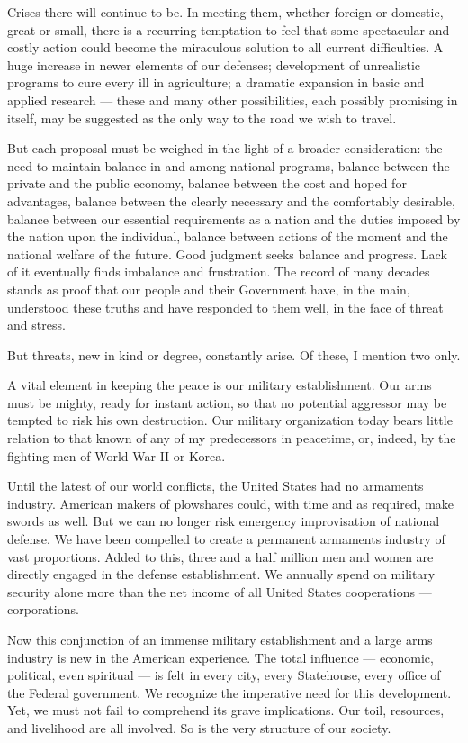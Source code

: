 \documentclass[a4paper]{amsbook}
\begin{document}
Crises there will continue to be. In meeting them, whether foreign or domestic, great or small, there is a recurring temptation to feel that some spectacular and costly action could become the miraculous solution to all current difficulties. A huge increase in newer elements of our defenses; development of unrealistic programs to cure every ill in agriculture; a dramatic expansion in basic and applied research — these and many other possibilities, each possibly promising in itself, may be suggested as the only way to the road we wish to travel.

But each proposal must be weighed in the light of a broader consideration: the need to maintain balance in and among national programs, balance between the private and the public economy, balance between the cost and hoped for advantages, balance between the clearly necessary and the comfortably desirable, balance between our essential requirements as a nation and the duties imposed by the nation upon the individual, balance between actions of the moment and the national welfare of the future. Good judgment seeks balance and progress. Lack of it eventually finds imbalance and frustration. The record of many decades stands as proof that our people and their Government have, in the main, understood these truths and have responded to them well, in the face of threat and stress.

But threats, new in kind or degree, constantly arise. Of these, I mention two only.

A vital element in keeping the peace is our military establishment. Our arms must be mighty, ready for instant action, so that no potential aggressor may be tempted to risk his own destruction. Our military organization today bears little relation to that known of any of my predecessors in peacetime, or, indeed, by the fighting men of World War II or Korea.

Until the latest of our world conflicts, the United States had no armaments industry. American makers of plowshares could, with time and as required, make swords as well. But we can no longer risk emergency improvisation of national defense. We have been compelled to create a permanent armaments industry of vast proportions. Added to this, three and a half million men and women are directly engaged in the defense establishment. We annually spend on military security alone more than the net income of all United States cooperations — corporations.

Now this conjunction of an immense military establishment and a large arms industry is new in the American experience. The total influence — economic, political, even spiritual — is felt in every city, every Statehouse, every office of the Federal government. We recognize the imperative need for this development. Yet, we must not fail to comprehend its grave implications. Our toil, resources, and livelihood are all involved. So is the very structure of our society.
\end{document}
